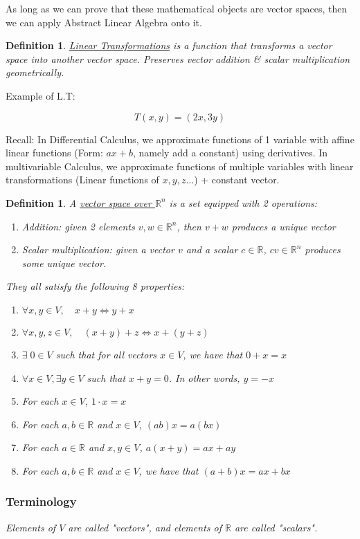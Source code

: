 \documentclass{article}
\newtheorem{definition}[theorem]{Definition}
\newtheorem{one minute paper}[theorem]{One Minute Paper}
\begin{document}
As long as we can prove that these mathematical objects are vector spaces, then we can apply Abstract Linear Algebra onto it. 

\begin{definition}
    \underline{Linear Transformations} is a function that transforms a vector space into another vector space. Preserves vector addition \& scalar multiplication geometrically. 
\end{definition}

Example of L.T:

\begin{equation}
    T(x,y) = (2x, 3y)
\end{equation}

Recall: In Differential Calculus, we approximate functions of 1 variable with affine linear functions (Form: $ax +b$, namely add a constant) using derivatives. In multivariable Calculus, we approximate functions of multiple
variables with linear transformations (Linear functions of $x,y,z\dots$) + constant vector. 

\begin{definition}
    A \underline{vector space over $\mathbb{R}^n$} is a set equipped with 2 operations:
    \begin{enumerate}
        \item Addition: given 2 elements $v,w \in \mathbb{R}^n$, then $v+w$ produces a unique vector
        \item Scalar multiplication: given a vector $v$ and a scalar $c \in \mathbb{R}$, $cv \in \mathbb{R}^n$ produces some unique vector. 
    \end{enumerate}
    They all satisfy the following 8 properties:
    \begin{enumerate}
        \item $\forall x,y \in V, \quad x + y \iff y + x$
        \item $\forall x,y,z \in V, \quad (x+y) + z \iff x + (y+z)$
        \item $\exists \; 0 \in V$ such that for all vectors $x \in V$, we have that $0 + x = x$
        \item $\forall x \in V, \exists y \in V$ such that $x + y = 0$. In other words, $y = -x$
        \item For each $x \in V$, $1\cdot x = x$
        \item For each $a,b \in \mathbb{R}$ and $x \in V$, $(ab)x = a(bx)$
        \item For each $a \in \mathbb{R}$ and $x,y \in V$, $a(x+y) = ax + ay$
        \item For each $a,b \in \mathbb{R}$ and $x \in V$, we have that $(a + b)x = ax + bx$
    \end{enumerate}
    \subsubsection*{Terminology}
    Elements of $V$ are called "vectors", and elements of $\mathbb{R}$ are called "scalars". 
\end{definition}
\end{document}
